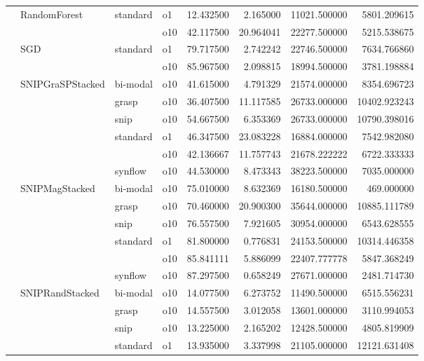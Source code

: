 \begin{longtable}{llllrrrr}
      & RandomForest & standard & o1 &  12.432500 &   2.165000 &     11021.500000 &   5801.209615 \\
      &     &         & o10 &  42.117500 &  20.964041 &     22277.500000 &   5215.538675 \\
      & SGD & standard & o1 &  79.717500 &   2.742242 &     22746.500000 &   7634.766860 \\
      &     &         & o10 &  85.967500 &   2.098815 &     18994.500000 &   3781.198884 \\
      & SNIPGraSPStacked & bi-modal & o10 &  41.615000 &   4.791329 &     21574.000000 &   8354.696723 \\
      &     & grasp & o10 &  36.407500 &  11.117585 &     26733.000000 &  10402.923243 \\
      &     & snip & o10 &  54.667500 &   6.353369 &     26733.000000 &  10790.398016 \\
      &     & standard & o1 &  46.347500 &  23.083228 &     16884.000000 &   7542.982080 \\
      &     &         & o10 &  42.136667 &  11.757743 &     21678.222222 &   6722.333333 \\
      &     & synflow & o10 &  44.530000 &   8.473343 &     38223.500000 &   7035.000000 \\
      & SNIPMagStacked & bi-modal & o10 &  75.010000 &   8.632369 &     16180.500000 &    469.000000 \\
      &     & grasp & o10 &  70.460000 &  20.900300 &     35644.000000 &  10885.111789 \\
      &     & snip & o10 &  76.557500 &   7.921605 &     30954.000000 &   6543.628555 \\
      &     & standard & o1 &  81.800000 &   0.776831 &     24153.500000 &  10314.446358 \\
      &     &         & o10 &  85.841111 &   5.886099 &     22407.777778 &   5847.368249 \\
      &     & synflow & o10 &  87.297500 &   0.658249 &     27671.000000 &   2481.714730 \\
      & SNIPRandStacked & bi-modal & o10 &  14.077500 &   6.273752 &     11490.500000 &   6515.556231 \\
      &     & grasp & o10 &  14.557500 &   3.012058 &     13601.000000 &   3110.994053 \\
      &     & snip & o10 &  13.225000 &   2.165202 &     12428.500000 &   4805.819909 \\
      &     & standard & o1 &  13.935000 &   3.337998 &     21105.000000 &  12121.631408 \\

\end{longtable}
